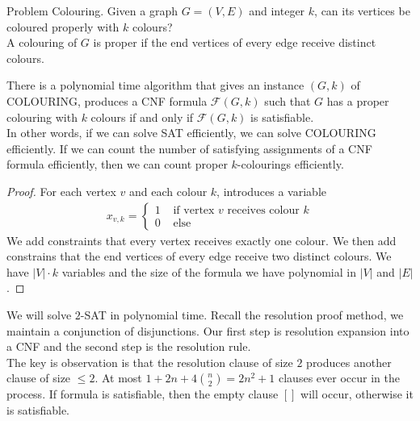 \documentclass[a4paper]{article}
\theoremstyle{plain}
\newtheorem{thm}{Theorem}[section]
\theoremstyle{definition}
\newtheorem{defn}{Definition}[section]
\theoremstyle{remark}
\begin{document}
\begin{tcolorbox}[colback=black!3!white,colframe=black!60!white,title=\begin{defn}Reduction \label{Reduction}\end{defn}]
Problem Colouring. Given a graph $G=(V,E)$ and integer $k$, can its vertices be coloured properly with $k$ colours?\\
A colouring of $G$ is proper if the end vertices of every edge receive distinct colours.
\end{tcolorbox}
\begin{tcolorbox}[colback=black!3!white,colframe=black!60!white,title=\begin{thm}Coloring to SAT \label{Coloring to SAT}\end{thm}]
	There is a polynomial time algorithm that gives an instance $(G,k)$ of COLOURING, produces a CNF formula $\mathcal{F}(G,k)$ such that $G$ has a proper colouring with $k$ colours if and only if $\mathcal{F}(G,k)$ is satisfiable. \\
	In other words, if we can solve SAT efficiently, we can solve COLOURING efficiently. If we can count the number of satisfying assignments of a CNF formula efficiently, then we can count proper $k$-colourings efficiently.
	\begin{proof}
		For each vertex $v$ and each colour $k$, introduces a variable
		\begin{align}
			x_{v,k} = 
			\begin{cases}
				1 & \text{ if vertex $v$ receives colour $k$}\\
				0 & \text{ else}
			\end{cases}
		\end{align}
		We add constraints that every vertex receives exactly one colour. We then add constrains that the end vertices of every edge receive two distinct colours. We have $|V| \cdot k$ variables and the size of the formula we have polynomial in $|V|$ and $|E|$.
	\end{proof}
\end{tcolorbox}
\begin{tcolorbox}[colback=black!3!white,colframe=black!60!white,title=\begin{defn}Resolution \label{Resolution}\end{defn}]
We will solve $2$-SAT in polynomial time. Recall the resolution proof method, we maintain a conjunction of disjunctions. Our first step is resolution expansion into a CNF and the second step is the resolution rule.  \\
The key is observation is that the resolution clause of size $2$ produces another clause of size $\le 2$. At most $1+2n+4 {n \choose 2} = 2n^2+1$ clauses ever occur in the process. If formula is satisfiable, then the empty clause $[]$ will occur, otherwise it is satisfiable. 
\end{tcolorbox}
\end{document}
